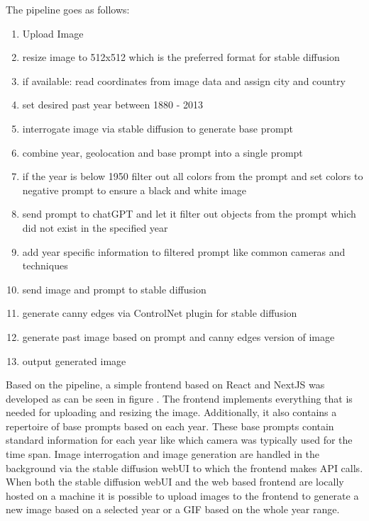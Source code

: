 \documentclass[english,notitlepage,smartquotes]{hgbreport}
\begin{document}
The pipeline goes as follows:
\begin{enumerate}
    \item Upload Image
    \item resize image to 512x512 which is the preferred format for stable diffusion
    \item if available: read coordinates from image data and assign city and country
    \item set desired past year between 1880 - 2013
    \item interrogate image via stable diffusion to generate base prompt
    \item combine year, geolocation and base prompt into a single prompt
    \item if the year is below 1950 filter out all colors from the prompt and set colors to negative prompt to ensure a black and white image
    \item send prompt to chatGPT and let it filter out objects from the prompt which did not exist in the specified year
    \item add year specific information to filtered prompt like common cameras and techniques
    \item send image and prompt to stable diffusion 
    \item generate canny edges via ControlNet plugin for stable diffusion
    \item generate past image based on prompt and canny edges version of image
    \item output generated image
\end{enumerate}

Based on the pipeline, a simple frontend based on React and NextJS was developed as can be seen in figure . The frontend implements everything that is needed for uploading and resizing the image. Additionally, it also contains a repertoire of base prompts based on each year. These base prompts contain standard information for each year like which camera was typically used for the time span. Image interrogation and image generation are handled in the background via the stable diffusion webUI to which the frontend makes API calls.
When both the stable diffusion webUI and the web based frontend are locally hosted on a machine it is possible to upload images to the frontend to generate a new image based on a selected year or a GIF based on the whole year range.
\end{document}

